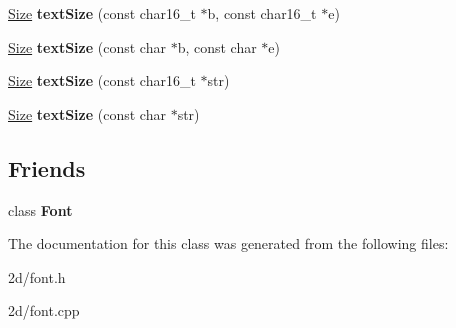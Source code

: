 \begin{DoxyCompactItemize}
\item 
\hypertarget{class_tempest_1_1_font_element_a1981ed16edfdeb7b8c633d01989c2b60}{\hyperlink{struct_tempest_1_1_size}{Size} {\bfseries text\+Size} (const char16\+\_\+t $\ast$b, const char16\+\_\+t $\ast$e)}\label{class_tempest_1_1_font_element_a1981ed16edfdeb7b8c633d01989c2b60}

\item 
\hypertarget{class_tempest_1_1_font_element_a92a8c76ed11c92a2d912ba1ea930ea50}{\hyperlink{struct_tempest_1_1_size}{Size} {\bfseries text\+Size} (const char $\ast$b, const char $\ast$e)}\label{class_tempest_1_1_font_element_a92a8c76ed11c92a2d912ba1ea930ea50}

\item 
\hypertarget{class_tempest_1_1_font_element_a135897428ef08c493429c713439aabd7}{\hyperlink{struct_tempest_1_1_size}{Size} {\bfseries text\+Size} (const char16\+\_\+t $\ast$str)}\label{class_tempest_1_1_font_element_a135897428ef08c493429c713439aabd7}

\item 
\hypertarget{class_tempest_1_1_font_element_ab14bd420d0eecf05434516769092f267}{\hyperlink{struct_tempest_1_1_size}{Size} {\bfseries text\+Size} (const char $\ast$str)}\label{class_tempest_1_1_font_element_ab14bd420d0eecf05434516769092f267}

\end{DoxyCompactItemize}
\subsection*{Friends}
\begin{DoxyCompactItemize}
\item 
\hypertarget{class_tempest_1_1_font_element_ad564b94b59dc295de3dfc4415d95cca8}{class {\bfseries Font}}\label{class_tempest_1_1_font_element_ad564b94b59dc295de3dfc4415d95cca8}

\end{DoxyCompactItemize}


The documentation for this class was generated from the following files\+:\begin{DoxyCompactItemize}
\item 
2d/font.\+h\item 
2d/font.\+cpp\end{DoxyCompactItemize}
